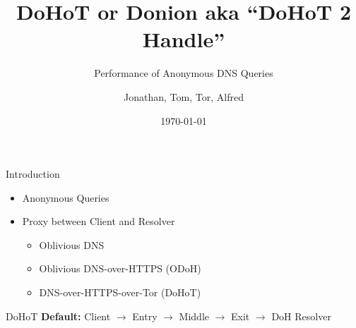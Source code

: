 \documentclass[xcolor=x11names,dvipsnames,aspectratio=169]{beamer}
\title{\huge DoHoT or Donion aka ``DoHoT 2 Handle''}
\subtitle{Performance of Anonymous DNS Queries}
\author{\small Jonathan, Tom, Tor, Alfred}
\date{\today}
\begin{document}
    \setcounter{showProgressBar}{0}
	\setcounter{showSlideNumbers}{0}

	\frame{\titlepage}

	\setcounter{framenumber}{0}
	\setcounter{showProgressBar}{1}
	\setcounter{showSlideNumbers}{1}

    \begin{frame}{Introduction}
        \begin{itemize}
            \item Anonymous Queries
            \item Proxy between Client and Resolver
            \begin{itemize}
                \item Oblivious DNS
                \item Oblivious DNS-over-HTTPS (ODoH)
                \item DNS-over-HTTPS-over-Tor (DoHoT)
            \end{itemize}
        \end{itemize}
    \end{frame}

    \begin{frame}{DoHoT}
        \textbf{Default:}
        Client $\rightarrow$
        Entry $\rightarrow$
        Middle $\rightarrow$
        Exit $\rightarrow$
        DoH Resolver

    \end{frame}
\end{document}

